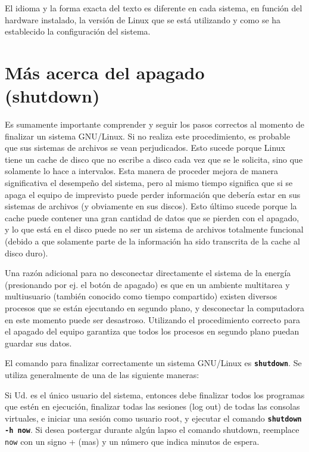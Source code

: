 \documentclass[12pt]{article}
\begin{document}
El idioma y la forma exacta del texto es diferente en cada sistema, en función
del hardware instalado, la versión de Linux que se está utilizando y como se ha
establecido la configuración del sistema.



\section{ Más acerca del apagado (shutdown)}

 Es sumamente importante comprender y seguir los pasos correctos al
momento de finalizar un sistema GNU/Linux. Si no realiza este procedimiento, es 
probable que sus sistemas de archivos se vean perjudicados. Esto sucede porque Linux 
tiene un cache de disco que no escribe a disco cada vez que se le solicita, sino 
que solamente lo hace a intervalos. Esta manera de proceder mejora de manera 
significativa el desempeño del sistema, pero al mismo tiempo significa que si se 
apaga el equipo de imprevisto puede perder información que debería estar en 
sus sistemas de archivos (y obviamente en sus discos). Esto último sucede porque la cache puede
contener una gran cantidad de datos que se pierden con el apagado, y lo que está
en el disco puede no ser un sistema de archivos totalmente funcional (debido a
que solamente parte de la información ha sido transcrita de la cache al disco
duro).  

 Una razón adicional para no desconectar directamente el sistema de la
energía (presionando por ej. el botón de apagado) es que en un ambiente
multitarea y multiusuario (también conocido como tiempo compartido) existen 
diversos procesos que se están ejecutando en segundo plano, y
desconectar la computadora en este momento puede ser desastroso. Utilizando el
procedimiento correcto para el apagado del equipo garantiza que todos los
procesos en segundo plano puedan guardar sus datos.  

 El comando para finalizar correctamente un sistema GNU/Linux es
\texttt{\textbf{shutdown}}. Se utiliza generalmente de una de las 
siguiente maneras: 

 Si Ud. es el único usuario del sistema, entonces debe finalizar todos los
programas que estén en ejecución, finalizar todas las sesiones (log out) de
todas las consolas virtuales, e iniciar una sesión como usuario root, y 
ejecutar el comando \texttt{\textbf{shutdown -h now}}. Si
desea postergar durante algún lapso el comando shutdown, reemplace
\texttt{now} con un signo + (mas) y un número que indica minutos de
espera.  
\end{document}
